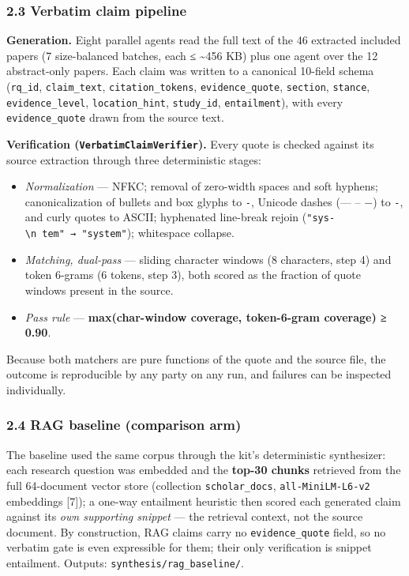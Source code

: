 \documentclass[11pt]{article}
\providecommand{\tightlist}{%
  \setlength{\itemsep}{0pt}\setlength{\parskip}{0pt}}
\begin{document}
\subsubsection{2.3 Verbatim claim
pipeline}\label{verbatim-claim-pipeline}

\textbf{Generation.} Eight parallel agents read the full text of the 46
extracted included papers (7 size-balanced batches, each ≤
\textasciitilde456 KB) plus one agent over the 12 abstract-only papers.
Each claim was written to a canonical 10-field schema (\texttt{rq\_id},
\texttt{claim\_text}, \texttt{citation\_tokens},
\texttt{evidence\_quote}, \texttt{section}, \texttt{stance},
\texttt{evidence\_level}, \texttt{location\_hint}, \texttt{study\_id},
\texttt{entailment}), with every \texttt{evidence\_quote} drawn from the
source text.

\textbf{Verification (\texttt{VerbatimClaimVerifier}).} Every quote is
checked against its source extraction through three deterministic
stages:

\begin{itemize}
\tightlist
\item
  \emph{Normalization} --- NFKC; removal of zero-width spaces and soft
  hyphens; canonicalization of bullets and box glyphs to \texttt{-},
  Unicode dashes (--- -- −) to \texttt{-}, and curly quotes to ASCII;
  hyphenated line-break rejoin
  (\texttt{"sys-\textbackslash{}n\ tem"\ →\ "system"}); whitespace
  collapse.
\item
  \emph{Matching, dual-pass} --- sliding character windows (8
  characters, step 4) and token 6-grams (6 tokens, step 3), both scored
  as the fraction of quote windows present in the source.
\item
  \emph{Pass rule} --- \textbf{max(char-window coverage, token-6-gram
  coverage) ≥ 0.90}.
\end{itemize}

Because both matchers are pure functions of the quote and the source
file, the outcome is reproducible by any party on any run, and failures
can be inspected individually.

\subsubsection{2.4 RAG baseline (comparison
arm)}\label{rag-baseline-comparison-arm}

The baseline used the same corpus through the kit's deterministic
synthesizer: each research question was embedded and the \textbf{top-30
chunks} retrieved from the full 64-document vector store (collection
\texttt{scholar\_docs}, \texttt{all-MiniLM-L6-v2} embeddings {[}7{]}); a
one-way entailment heuristic then scored each generated claim against
its \emph{own supporting snippet} --- the retrieval context, not the
source document. By construction, RAG claims carry no
\texttt{evidence\_quote} field, so no verbatim gate is even expressible
for them; their only verification is snippet entailment. Outputs:
\texttt{synthesis/rag\_baseline/}.
\end{document}
